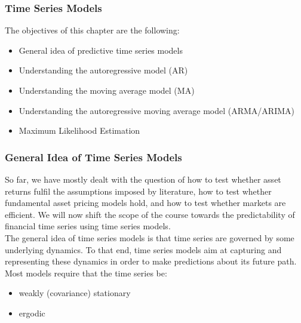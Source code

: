 \documentclass[xcolor=dvipsnames, english, 8pt]{beamer}
\begin{document}
\begin{frame}
    \frametitle{Time Series Models}
    The objectives of this chapter are the following:\vspace{0.25cm}\\
    \begin{itemize}
        \item General idea of predictive time series models
        \item Understanding the autoregressive model (AR)
        \item Understanding the moving average model (MA)
        \item Understanding the autoregressive moving average model (ARMA/ARIMA)
        \item Maximum Likelihood Estimation
    \end{itemize}
\end{frame}

\begin{frame}
    \frametitle{General Idea of Time Series Models}
So far, we have mostly dealt with the question of how to test whether asset returns fulfil the assumptions imposed by literature, how to test whether fundamental asset pricing models hold, and how to test whether markets are efficient. We will now shift the scope of the course towards the predictability of financial time series using time series models. \vspace{0.25cm}\\

The general idea of time series models is that {\color{ubRed}time series are governed by some underlying dynamics}. To that end, {\color{ubRed}time series models aim at capturing and representing these dynamics} in order to make predictions about its future path. Most models require that the time series be:\vspace{0.25cm}\\
\begin{itemize}
    \item weakly (covariance) stationary
    \item ergodic
\end{itemize}
\end{frame}
\end{document}
